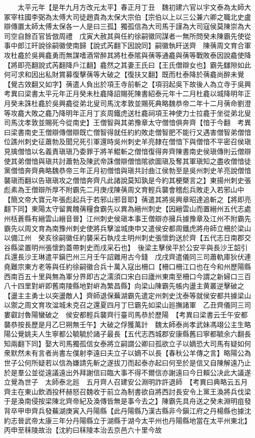　　太平元年【是年九月方改元太平】春正月丁丑　魏初建六官以宇文泰為太師大冢宰柱國李弼為太傅大司徒趙貴為太保大宗伯【宗伯以上以三公兼六卿之職北史盧辯傳置太師太傅太保各一人是曰三孤】獨孤信為大司馬于謹為大司寇侯莫陳崇為大司空自餘百官皆倣周禮　戊寅大赦其與任約徐嗣徽同謀者一無所問癸未陳霸先使從事中郎江旰說徐嗣徽使南歸【說式芮翻下因說同】嗣徽執旰送齊　陳蒨周文育合軍攻杜龕於吳興龕勇而無謀嗜酒常醉其將杜泰隂與蒨等通龕與蒨等戰敗泰因說龕使降【將即亮翻說式芮翻降戶江翻】龕然之其妻王氏曰【王氏僧辯女也】霸先讎隙如此何可求和因出私財賞募復擊蒨等大破之【復扶又翻】既而杜泰降於蒨龕尚醉未覺【覺古效翻又如字】蒨遣人負出於項王寺前斬之【項羽起吳下故後人為立寺于吳興　考異曰梁書太平元年正月癸未杜龕降詔賜死陳書紹泰元年十二月杜龕以城降明年正月癸未誅杜龕於吳興龕從弟北叟司馬沈孝敦並賜死典略魏恭帝二年十二月蒨命劉澄等攻龕大敗之龕乃降明年正月丁亥周鐵虎送杜龕祠項王神使力士拉龕于坐從弟北叟司馬沈孝敦並賜死今從南史】王僧智與其弟豫章太守僧愔俱奔齊【愔于今翻　考異曰梁書南史王僧辯傳僧辯既亡僧智得就任約約敗走僧智肥不能行又遇害僧智弟僧愔位譙州刺史征蕭勃及聞兄死引軍還時吳州刺史羊亮隸在僧愔下與僧愔不平密召侯瑱見擒僧愔以名義責瑱瑱乃委罪于將羊鯤斬之僧愔復得奔齊陳書南史侯瑱傳則云僧辯使其弟僧愔與瑱共討蕭勃及陳武帝誅僧辯僧愔隂欲圖瑱及奪其軍瑱知之盡收僧愔徒黨僧愔奔齊典略魏恭帝三年正月初僧愔與瑱共討曲江侯勃至是吳州刺史羊亮說僧愔襲瑱而翻以告瑱瑱攻之僧愔奔齊凡此諸說莫知孰是今約其梗槩言之】東揚州刺史張彪素為王僧辯所厚不附霸先二月庚戌陳蒨周文育輕兵襲會稽彪兵敗走入若邪山中【簡文帝大寶元年張彪起兵于若邪山邪音耶】蒨遣其將吳興章昭達追斬之【將即亮翻下同】東陽太守留異餽蒨糧食霸先以異為縉州刺史【因縉雲山而置縉州五代志處州栝蒼縣有縉雲山縉音晉】江州刺史侯瑱本事王僧辯亦擁兵據豫章及江州不附霸先霸先以周文育為南豫州刺史使將兵擊湓城庚申又遣侯安都周鐵虎將舟師立柵於梁山以備江州　癸亥徐嗣徽任約襲采石執戍主明州刺史張懷鈞送於齊【五代志日南郡交谷縣梁置明州張懷鈞蓋帶刺史而戌采石也】　後梁主擊侯平於公安平與長沙王韶引兵還長沙王琳遣平鎭巴州三月壬午詔雜用古今錢　戊戌齊遣儀同三司蕭軌庫狄伏連堯難宗東方老等與任約徐嗣徽合兵十萬入寇出柵口【柵口柵江口也在今和州歷陽縣西南百五十里與無為軍分界即古之濡須口宋白曰廬州東南至柵口今謂之新婦口三百八十四里對㟁即舊南陵縣地對㟁為繁昌縣】向梁山陳霸先帳内盪主黄叢逆擊破之【盪主主勇士以突盪敵人】齊師退保蕪湖霸先遣定州刺史沈泰等就侯安都共據梁山以禦之周文育攻湓城未克召之還夏四月丁巳霸先如梁山廵撫諸軍　乙丑齊儀同三司婁叡討魯陽蠻破之　侯安都輕兵襲齊行臺司馬恭於歷陽　【考異曰梁書云壬午安都襲恭按長歷是月乙巳朔無壬午】大破之俘獲萬計　魏太師泰尚孝武妹馮翊公主生略陽公覺姚夫人生寧都公毓毓於諸子最長【五代志西城郡安康縣舊曰寧都毓余六翻長知兩翻下同】娶大司馬獨孤信女泰將立嗣謂公卿曰孤欲立子以嫡恐大司馬有疑如何衆默然未有言者尚書左僕射李遠曰夫立子以嫡不以長【春秋公羊傳之言】略陽公為世子公何所疑若以信為嫌請先斬之遂拔刀而起泰亦起曰何至於是信又自陳解遠乃止於是羣公並從遠議遠出外拜謝信曰臨大事不得不爾信亦謝遠曰今日賴公决此大議遂立覺為世子　太師泰北廵　五月齊人召建安公淵明詐許退師　【考異曰典略云五月齊主在東山飲酒投杯赫怒召魏收于前立為制書欲自將西討長安令上黨王渙將兵伐梁于是渙南侵按梁陳北齊帝紀及渙傳皆無是事今去之】陳霸先具舟送之癸未淵明疽發背卒甲申齊兵發蕪湖庚寅入丹陽縣【此丹陽縣乃漢古縣非今鎭江府之丹楊縣也據沈約志晉武帝太康三年分丹陽縣立于湖縣于湖今太平州也丹陽縣地當在太平州東北】丙申至秣陵故治【沈約曰秣陵本治去京邑六十里今故